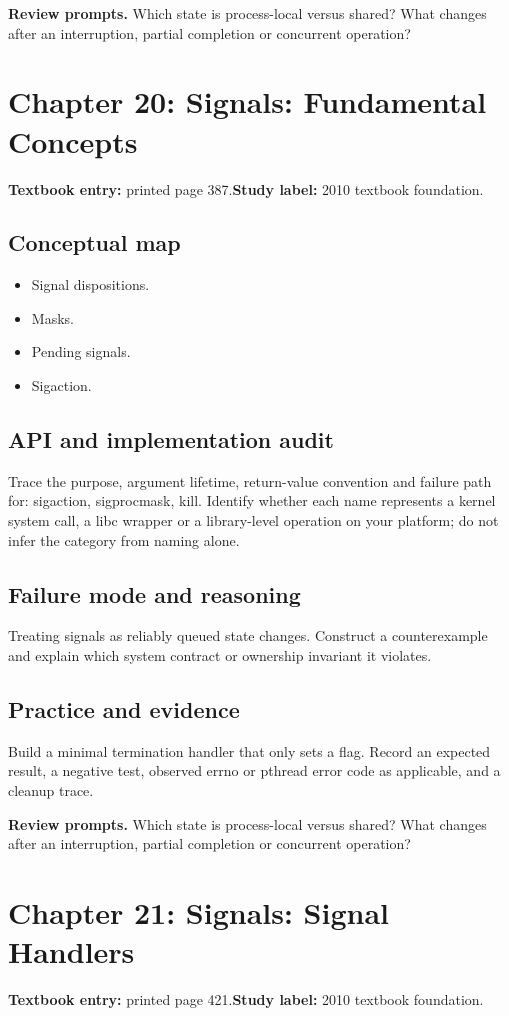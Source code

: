 \documentclass[11pt,letterpaper,oneside]{report}
\begin{document}
\textbf{Review prompts.} Which state is process-local versus shared? What changes after an interruption, partial completion or concurrent operation?

\section{Chapter 20: Signals: Fundamental Concepts}
\textbf{Textbook entry:} printed page 387.\quad \textbf{Study label:} 2010 textbook foundation.

\subsection{Conceptual map}
\begin{itemize}
\item Signal dispositions.
\item Masks.
\item Pending signals.
\item Sigaction.
\end{itemize}
\subsection{API and implementation audit}
Trace the purpose, argument lifetime, return-value convention and failure path for: sigaction, sigprocmask, kill. Identify whether each name represents a kernel system call, a libc wrapper or a library-level operation on your platform; do not infer the category from naming alone.

\subsection{Failure mode and reasoning}
Treating signals as reliably queued state changes. Construct a counterexample and explain which system contract or ownership invariant it violates.

\subsection{Practice and evidence}
Build a minimal termination handler that only sets a flag. Record an expected result, a negative test, observed errno or pthread error code as applicable, and a cleanup trace.

\textbf{Review prompts.} Which state is process-local versus shared? What changes after an interruption, partial completion or concurrent operation?

\section{Chapter 21: Signals: Signal Handlers}
\textbf{Textbook entry:} printed page 421.\quad \textbf{Study label:} 2010 textbook foundation.
\end{document}
